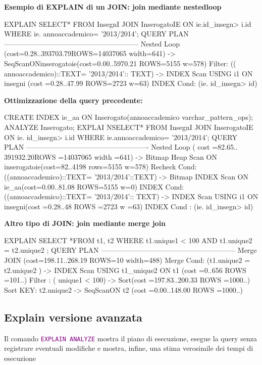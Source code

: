 \textbf{Esempio di EXPLAIN di un JOIN: join mediante nestedloop}
\begin{codiceSQL}
EXPLAIN SELECT* FROM InsegnI JOIN InserogatoIE ON ie.id_insegn> i.id WHERE ie. annoaccademico= '2013/2014';
QUERY PLAN
---------------------------------------------------------
Nested Loop (cost=0.28..393703.79ROWS=14037065 width=641)
-> SeqScanONinserogatoie(cost=0.00..5970.21 ROWS=5155 w=578)
Filter: (( annoaccademico)::TEXT= '2013/2014':: TEXT)
-> INDEX Scan USING i1 ON insegni (cost =0.28..47.99 ROWS=2723 w=63)
INDEX Cond: (ie. id_insegn> id)
\end{codiceSQL}


\textbf{Ottimizzazione della query precedente:}
\begin{codiceSQL}
CREATE INDEX ie_aa ON Inserogato(annoaccademico varchar_pattern_ops);
ANALYZE Inserogato;
EXPLAI NSELECT* FROM InsegnI JOIN InserogatoIE ON ie. id_insegn> i.id WHERE ie.annoaccademico= '2013/2014';
QUERY PLAN
----------------------------------------------------
Nested Loop ( cost =82.65.. 391932.20ROWS =14037065 width =641)
-> Bitmap Heap Scan ON inserogatoie(cost=82..4198 rows=5155 w=578)
Recheck Cond: ((annoaccademico)::TEXT= '2013/2014'::TEXT)
-> Bitmap INDEX Scan ON ie_aa(cost=0.00..81.08 ROWS=5155 w=0)
INDEX Cond: ((annoaccademico)::TEXT= '2013/2014':: TEXT)
-> INDEX Scan USING i1 ON insegni(cost =0.28..48 ROWS =2723 w =63)
INDEX Cond : (ie. id_insegn> id)
\end{codiceSQL}

\textbf{Altro tipo di JOIN: join mediante merge join}

\begin{codiceSQL}
EXPLAIN SELECT *FROM t1, t2
WHERE t1.unique1 < 100 AND t1.unique2 = t2.unique2 ;
QUERY PLAN
---------------------------------------------------------
Merge JOIN (cost=198.11..268.19 ROWS=10 width=488)
Merge Cond: (t1.unique2 = t2.unique2 )
-> INDEX Scan USING t1_unique2 ON t1 (cost =0..656 ROWS =101..)
Filter : ( unique1 < 100)
-> Sort(cost =197.83..200.33 ROWS =1000..)
Sort KEY: t2.unique2
-> SeqScanON t2 (cost =0.00..148.00 ROWS =1000..)
\end{codiceSQL}


\subsection{Explain versione avanzata}

Il comando \texttt{\textcolor{purple}{EXPLAIN ANALYZE}} mostra il piano di esecuzione, esegue la query senza registrare eventuali modifiche e mostra, infine, una stima verosimile dei tempi di esecuzione


